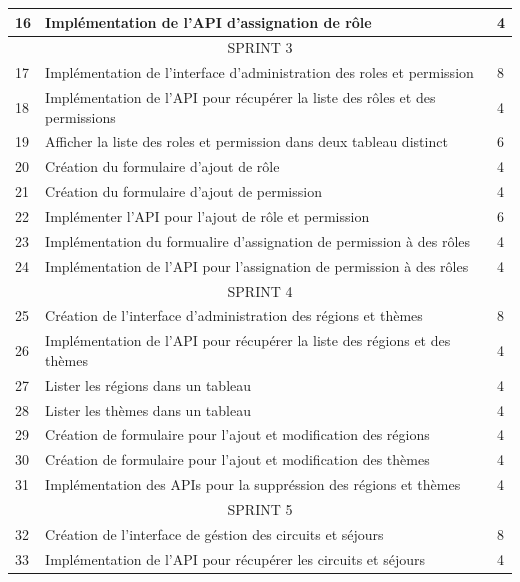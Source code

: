 \documentclass[12pt]{report}
\begin{document}
\begin{longtable}{|p{1cm}|p{7cm}|p{6cm}|}
						\hline
						16 & Implémentation de l'API d'assignation de rôle & 4\\
						\hline
						\multicolumn{3}{|c|}{SPRINT 3}\\
						\hline
						17 & Implémentation de l'interface d'administration des roles et permission & 8\\
						\hline
						18 & Implémentation de l'API pour récupérer la liste des rôles et des permissions & 4\\
						\hline
						19 & Afficher la liste des roles et permission dans deux tableau distinct & 6\\
						\hline
						20 & Création du formulaire d'ajout de rôle & 4\\
						\hline
						21 & Création du formulaire d'ajout de permission & 4\\	
						\hline
						22 & Implémenter l'API pour l'ajout de rôle et permission& 6\\
						\hline
						23 & Implémentation du formualire d'assignation de permission à des rôles & 4\\
						\hline
						24 & Implémentation de l'API pour l'assignation de permission à des rôles & 4\\
						\hline
						\multicolumn{3}{|c|}{SPRINT 4}\\
						\hline
						25 & Création de l'interface d'administration des régions et thèmes & 8\\
						\hline
						26 & Implémentation de l'API pour récupérer la liste des régions et des thèmes & 4\\
						\hline
						27 & Lister les régions dans un tableau & 4\\
						\hline
						28 & Lister les thèmes dans un tableau & 4\\
						\hline
						29 & Création de formulaire pour l'ajout et modification des régions & 4\\
						\hline
						30 & Création de formulaire pour l'ajout et modification des thèmes & 4\\
						\hline
						31 & Implémentation des APIs pour la suppréssion des régions et thèmes & 4\\
						\hline
						\multicolumn{3}{|c|}{SPRINT 5}\\
						\hline
						32 & Création de l'interface de géstion des circuits et séjours & 8\\
						\hline
						33 & Implémentation de l'API pour récupérer les circuits et séjours & 4\\
						\hline

\end{longtable}
\end{document}
